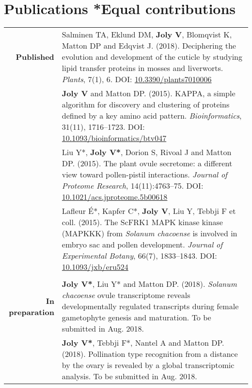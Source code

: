 \documentclass[letterpaper,10pt]{article}
\begin{document}
\section{Publications \hfill \small{*Equal contributions}}
\begin{tabular}{r|p{13.8cm}}

\textbf{Published}

& Salminen TA, Eklund DM, \textbf{Joly V}, Blomqvist K, Matton DP
  and Edqvist J. (2018).
  Deciphering the evolution and development of the cuticle by studying lipid
  transfer proteins in mosses and liverworts.
  \emph{Plants}, 7(1), 6.
  DOI: \href{http://doi.org/10.3390/plants7010006}{10.3390/plants7010006}
  \vspace{3mm} \\

& \textbf{Joly V} and Matton DP. (2015).
  KAPPA, a simple algorithm for discovery and clustering of proteins defined by
  a key amino acid pattern.
  \emph{Bioinformatics}, 31(11), 1716--1723.
  DOI: \href{http://doi.org/10.1093/bioinformatics/btv047}
  {10.1093/bioinformatics/btv047}
  \vspace{3mm} \\

& Liu Y*, \textbf{Joly V*}, Dorion S, Rivoal J and Matton DP. (2015).
  The plant ovule secretome: a different view toward pollen-pistil interactions.
  \emph{Journal of Proteome Research}, 14(11):4763--75.
  DOI: \href{http://doi.org/10.1021/acs.jproteome.5b00618}
  {10.1021/acs.jproteome.5b00618}
  \vspace{3mm} \\

& Lafleur É*, Kapfer C*, \textbf{Joly V}, Liu Y, Tebbji F et coll. (2015).
  The ScFRK1 MAPK kinase kinase (MAPKKK) from \emph{Solanum chacoense} is
  involved in embryo sac and pollen development.
  \emph{Journal of Experimental Botany}, 66(7), 1833--1843.
  DOI: \href{http://doi.org/10.1093/jxb/eru524}{10.1093/jxb/eru524}
  \\

\multicolumn{2}{c}{} \\

\textbf{In preparation}

& \textbf{Joly V*}, Liu Y* and Matton DP. (2018).
  \emph{Solanum chacoense} ovule transcriptome reveals developmentally regulated
  transcripts during female gametophyte genesis and maturation.
  To be submitted in Aug. 2018.
  \vspace{3mm} \\

& \textbf{Joly V*}, Tebbji F*, Nantel A and Matton DP. (2018).
  Pollination type recognition from a distance by the ovary is revealed by a
  global transcriptomic analysis.
  To be submitted in Aug. 2018.
  \\

\end{tabular}
\end{document}
